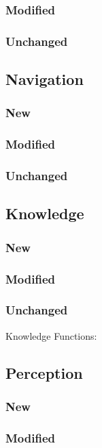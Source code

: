 \documentclass[main.tex]{subfiles}
\begin{document}
                \subsubsection{Modified}
                \subsubsection{Unchanged}
                
                \subsection{Navigation}
                \subsubsection{New}
                \subsubsection{Modified}
                \subsubsection{Unchanged}
                
                \subsection{Knowledge}
                \subsubsection{New}
                \subsubsection{Modified}
                \subsubsection{Unchanged}Knowledge Functions:
                
                \subsection{Perception}
                \subsubsection{New}
                \subsubsection{Modified}
\end{document}
